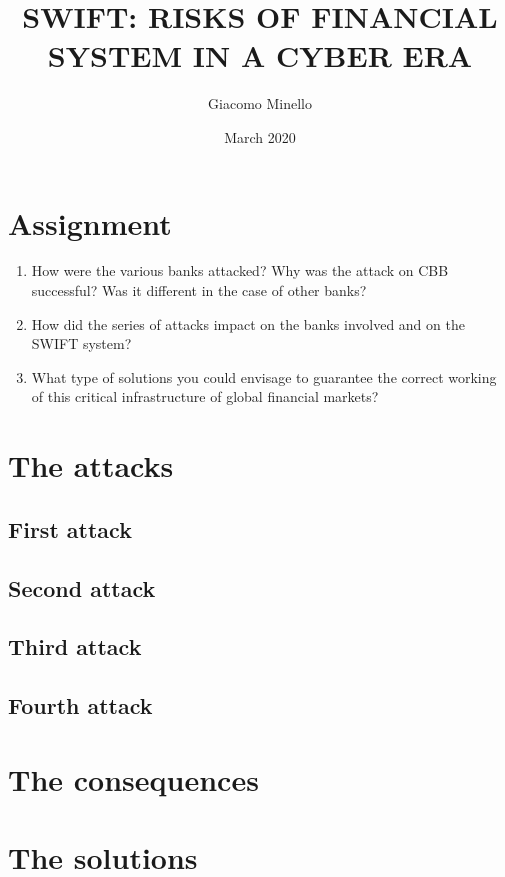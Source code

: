 \documentclass{article}
\title{SWIFT: RISKS OF FINANCIAL SYSTEM IN A CYBER ERA}
\author{Giacomo Minello}
\date{March 2020}
\begin{document}
\maketitle

\section*{Assignment}
\begin{enumerate}
    \item How were the various banks attacked? Why was the attack on CBB successful? Was it different in the case of other banks?
    \item How did the series of attacks impact on the banks involved and on the SWIFT system?
    \item What type of solutions you could envisage to guarantee the correct working of this critical infrastructure of global financial markets?
\end{enumerate}

\section{The attacks}
\subsection{First attack}
\subsection{Second attack}
\subsection{Third attack}
\subsection{Fourth attack}

\section{The consequences}

\section{The solutions}
\end{document}
